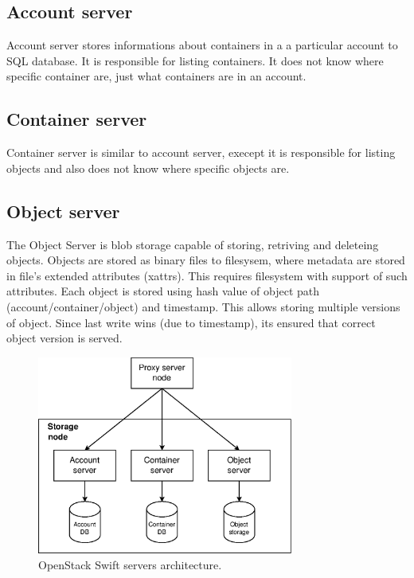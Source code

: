     \subsection{Account server}
    Account server stores informations about containers in a a particular account to SQL database. It is responsible for listing containers. It does not know where specific container are, just what containers are in an account\cite{SwiftArchitecturalOverview}.

    \subsection{Container server}
    Container server is similar to account server, execept it is responsible for listing objects and also does not know where specific objects are\cite{SwiftArchitecturalOverview}.

    \subsection{Object server}
    The Object Server is blob storage capable of storing, retriving and deleteing objects. Objects are stored as binary files to filesysem, where metadata are stored in file's extended attributes (xattrs). This requires filesystem with support of such attributes. Each object is stored using hash value of object path (account/container/object) and timestamp. This allows storing multiple versions of object. Since last write wins (due to timestamp), its ensured that correct object version is served\cite{SwiftArchitecturalOverview}.

    \begin{figure}[hbt]
        \centering
        \includegraphics[width=0.75\textwidth]{obrazky-figures/swift-servers.eps}
        \caption{OpenStack Swift servers architecture.}
        \label{fig:beanstalkdJobSM}
    \end{figure}

